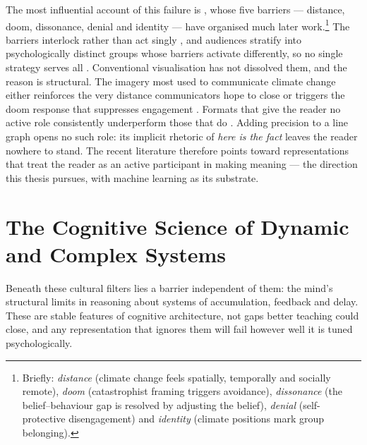 The most influential account of this failure is \citet{stoknes2015}, whose five barriers --- distance, doom, dissonance, denial and identity --- have organised much later work.\footnote{Briefly: \emph{distance} (climate change feels spatially, temporally and socially remote), \emph{doom} (catastrophist framing triggers avoidance), \emph{dissonance} (the belief--behaviour gap is resolved by adjusting the belief), \emph{denial} (self-protective disengagement) and \emph{identity} (climate positions mark group belonging).} The barriers interlock rather than act singly \citep{vanderlinden2015}, and audiences stratify into psychologically distinct groups whose barriers activate differently, so no single strategy serves all \citep{leiserowitz2021}. Conventional visualisation has not dissolved them, and the reason is structural. The imagery most used to communicate climate change either reinforces the very distance communicators hope to close or triggers the doom response that suppresses engagement \citep{cornerclimate2015, nicholsoncole2005}. Formats that give the reader no active role consistently underperform those that do \citep{ojala2023}. Adding precision to a line graph opens no such role: its implicit rhetoric of \emph{here is the fact} leaves the reader nowhere to stand. The recent literature therefore points toward representations that treat the reader as an active participant in making meaning \citep{marlon2019, morris2019} --- the direction this thesis pursues, with machine learning as its substrate.

\section{The Cognitive Science of Dynamic and Complex Systems}
\label{sec:cognitive-science}

Beneath these cultural filters lies a barrier independent of them: the mind's structural limits in reasoning about systems of accumulation, feedback and delay. These are stable features of cognitive architecture, not gaps better teaching could close, and any representation that ignores them will fail however well it is tuned psychologically.

